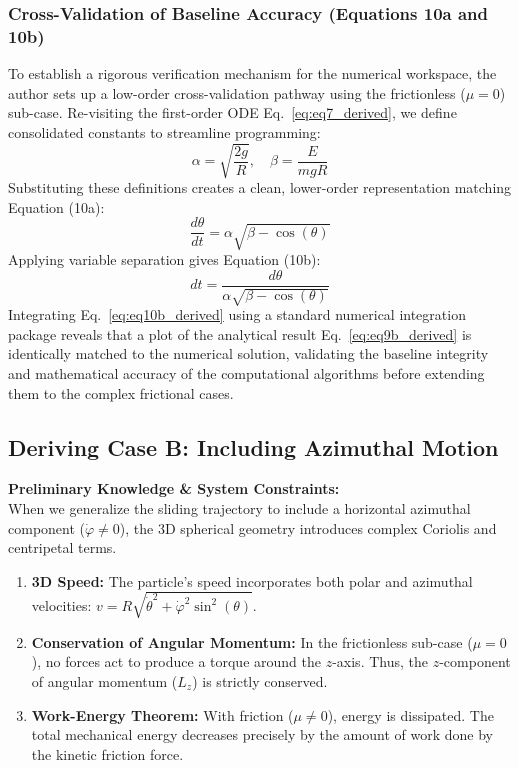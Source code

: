 \documentclass[11pt,letterpaper]{article}
\begin{document}
\subsubsection{Cross-Validation of Baseline Accuracy (Equations 10a and 10b)}
To establish a rigorous verification mechanism for the numerical workspace, the author sets up a low-order cross-validation pathway using the frictionless ($\mu = 0$) sub-case. Re-visiting the first-order ODE Eq.~\eqref{eq:eq7_derived}, we define consolidated constants to streamline programming:
\begin{equation}
\alpha = \sqrt{\frac{2g}{R}}, \quad \beta = \frac{E}{mgR}
\end{equation}
Substituting these definitions creates a clean, lower-order representation matching Equation (10a):
\begin{equation}\label{eq:eq10a_derived}
\frac{d\theta}{dt} = \alpha\sqrt{\beta - \cos(\theta)}
\end{equation}
Applying variable separation gives Equation (10b):
\begin{equation}\label{eq:eq10b_derived}
dt = \frac{d\theta}{\alpha\sqrt{\beta - \cos(\theta)}}
\end{equation}
Integrating Eq.~\eqref{eq:eq10b_derived} using a standard numerical integration package reveals that a plot of the analytical result Eq.~\eqref{eq:eq9b_derived} is identically matched to the numerical solution, validating the baseline integrity and mathematical accuracy of the computational algorithms before extending them to the complex frictional cases.

\subsection{Deriving Case B: Including Azimuthal Motion}
\textbf{Preliminary Knowledge \& System Constraints:} \\
When we generalize the sliding trajectory to include a horizontal azimuthal component ($\dot{\varphi} \neq 0$), the 3D spherical geometry introduces complex Coriolis and centripetal terms.
\begin{enumerate}
    \item \textbf{3D Speed:} The particle's speed incorporates both polar and azimuthal velocities: $v = R\sqrt{\dot{\theta}^2 + \dot{\varphi}^2\sin^2(\theta)}$.
    \item \textbf{Conservation of Angular Momentum:} In the frictionless sub-case ($\mu=0$), no forces act to produce a torque around the $z$-axis. Thus, the $z$-component of angular momentum ($L_z$) is strictly conserved.
    \item \textbf{Work-Energy Theorem:} With friction ($\mu \neq 0$), energy is dissipated. The total mechanical energy decreases precisely by the amount of work done by the kinetic friction force.
\end{enumerate}
\end{document}
